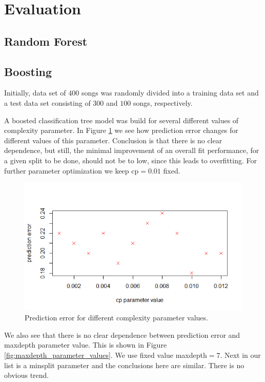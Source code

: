 \documentclass{article}
\begin{document}
\section{Evaluation}

\subsection{Random Forest}

\subsection{Boosting}

Initially, data set of $400$ songs was randomly divided into a training data set and a test data set consisting of $300$ and $100$ songs, respectively. 

A boosted classification tree model was build for several different values of complexity parameter. In Figure \ref{fig:complexity_parameter_values} we see how prediction error changes for different values of this parameter. Conclusion is that there is no clear dependence, but still, the minimal improvement of an overall fit performance, for a given split to be done, should not be to low, since this leads to overfitting. For further parameter optimization we keep {\selectfont cp$=0.01$} fixed.
 
 \begin{figure}[h] %
\includegraphics[scale=0.65]{figs/cp_values.png}
\centering
\caption{Prediction error for different complexity parameter values.} \label{fig:complexity_parameter_values}
\end{figure}
 
 We also see that there is no clear dependence between prediction error and {\selectfont maxdepth} parameter value. This is shown in Figure \ref{fig:maxdepth_parameter_values}. We use fixed value {\selectfont maxdepth$=7$}. Next in our list is a {\selectfont minsplit} parameter and the conclusions here are similar. There is no obvious trend.
 
\end{document}
